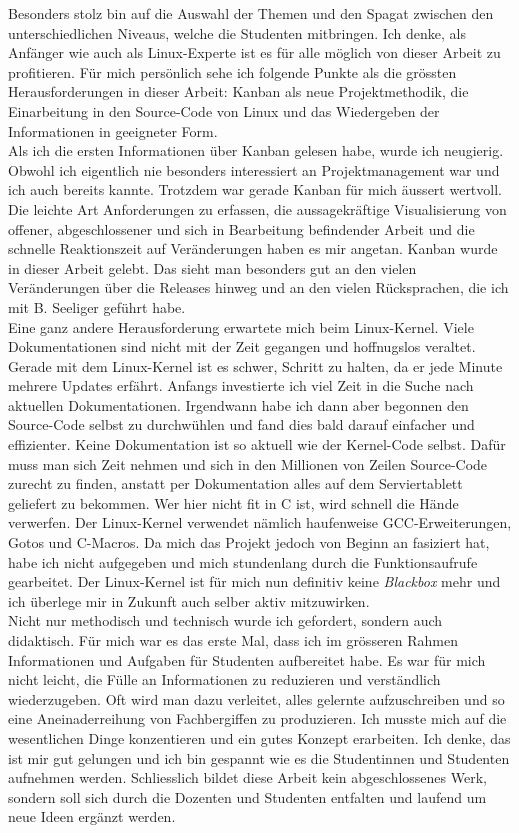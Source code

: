 Besonders stolz bin auf die Auswahl der Themen und den Spagat zwischen den unterschiedlichen Niveaus, welche die Studenten mitbringen. Ich denke, als Anfänger
wie auch als Linux-Experte ist es für alle möglich von dieser Arbeit zu profitieren. Für mich persönlich sehe ich folgende Punkte als die grössten Herausforderungen in dieser Arbeit: Kanban als neue
Projektmethodik, die Einarbeitung in den Source-Code von Linux und das Wiedergeben der Informationen in geeigneter Form. \\

Als ich die ersten Informationen über Kanban gelesen habe, wurde ich neugierig. Obwohl ich eigentlich nie besonders interessiert an Projektmanagement war und ich auch bereits  kannte.
Trotzdem war gerade Kanban für mich äussert wertvoll. Die leichte Art Anforderungen zu erfassen, die aussagekräftige Visualisierung von offener, abgeschlossener und sich in Bearbeitung befindender Arbeit
und die schnelle Reaktionszeit auf Veränderungen haben es mir angetan. Kanban wurde in dieser Arbeit gelebt. Das sieht man besonders gut an den vielen Veränderungen über die Releases hinweg und an
den vielen Rücksprachen, die ich mit B. Seeliger geführt habe. \\

Eine ganz andere Herausforderung erwartete mich beim Linux-Kernel. Viele Dokumentationen sind nicht mit der Zeit gegangen und hoffnugslos veraltet. Gerade mit dem Linux-Kernel ist es schwer, Schritt zu halten,
da er jede Minute mehrere Updates erfährt. Anfangs investierte ich viel Zeit in die Suche nach aktuellen Dokumentationen. Irgendwann habe ich dann aber begonnen den Source-Code selbst zu durchwühlen und fand dies bald darauf
einfacher und effizienter. Keine Dokumentation ist so aktuell wie der Kernel-Code selbst. Dafür muss man sich Zeit nehmen und sich in den Millionen von Zeilen Source-Code zurecht zu finden, anstatt per Dokumentation
alles auf dem Serviertablett geliefert zu bekommen. Wer hier nicht fit in C ist, wird schnell die Hände verwerfen. Der Linux-Kernel verwendet nämlich haufenweise GCC-Erweiterungen, Gotos und C-Macros. Da mich das Projekt
jedoch von Beginn an fasiziert hat, habe ich nicht aufgegeben und mich stundenlang durch die Funktionsaufrufe gearbeitet. Der Linux-Kernel ist für mich nun definitiv keine \emph{Blackbox} mehr und ich überlege mir in Zukunft auch selber aktiv
mitzuwirken. \\

Nicht nur methodisch und technisch wurde ich gefordert, sondern auch didaktisch. Für mich war es das erste Mal, dass ich im grösseren Rahmen Informationen und Aufgaben für Studenten aufbereitet habe. Es war für mich
nicht leicht, die Fülle an Informationen zu reduzieren und verständlich wiederzugeben. Oft wird man dazu verleitet, alles gelernte aufzuschreiben und so eine Aneinaderreihung von Fachbergiffen zu produzieren. Ich musste
mich auf die wesentlichen Dinge konzentieren und ein gutes Konzept erarbeiten. Ich denke, das ist mir gut gelungen und ich bin gespannt wie es die Studentinnen und Studenten aufnehmen werden. Schliesslich bildet diese Arbeit kein
abgeschlossenes Werk, sondern soll sich durch die Dozenten und Studenten entfalten und laufend um neue Ideen ergänzt werden.


